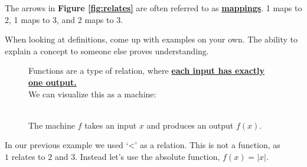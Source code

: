\noindent
The arrows in \textbf{Figure \ref{fig:relates}} are often referred to as \underline{\textbf{mappings}}. 1 maps to 2, 1 maps to 3, and 2 maps to 3.\\

\begin{Tip}
    When looking at definitions, come up with examples on your own. The ability to explain a concept to someone else
    proves understanding.\\
\end{Tip}

\newpage


\begin{figure}
    Functions are a type of relation, where \underline{\textbf{each input has exactly one output.}}\\
    We can visualize this as a machine:\\\\


    \hspace{3em}
    \caption{\centering The machine $f$ takes an input $x$ and produces an output $f(x)$.}
    \label{fig:machine}
\end{figure}

\noindent
In our previous example we used `<' as a relation. This is not a function, as\\
$1$ relates to $2$ and $3$. Instead let's use the absolute function, $f(x)=|x|$.

